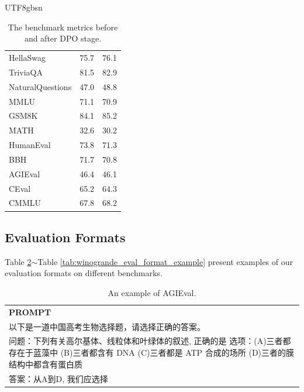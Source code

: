 \documentclass[11pt, a4paper, logo, copyright, nonumbering]{deepseek}
\begin{document}
\begin{CJK*}{UTF8}{gbsn}
\begin{table}[h]
\begin{tabular}{lcc}
HellaSwag & 75.7 & 76.1 \\

TriviaQA & 81.5 & 82.9 \\

NaturalQuestions & 47.0 & 48.8 \\

MMLU & 71.1 & 70.9 \\

GSM8K & 84.1 & 85.2 \\

MATH & 32.6 & 30.2 \\

HumanEval & 73.8 & 71.3 \\

BBH & 71.7 & 70.8 \\

AGIEval & 46.4 & 46.1 \\

CEval & 65.2 & 64.3 \\

CMMLU & 67.8 & 68.2 \\
\bottomrule
\end{tabular}
    \caption{\centering The benchmark metrics before and after DPO stage. }
    \label{tab: dpo}
\end{table}

\subsection{Evaluation Formats}
\label{appendix:eval_formats}
Table \ref{tab:agieval_eval_format_example}$\sim$Table \ref{tab:winogrande_eval_format_example} present examples of our evaluation formats on different benchmarks.

\begin{table}[h]
    \centering \small
\begin{tabular}{p{12cm}}
\toprule
\textbf{PROMPT}\\
以下是一道中国高考生物选择题，请选择正确的答案。\\
问题：下列有关高尔基体、线粒体和叶绿体的叙述, 正确的是 选项：(A)三者都存在于蓝藻中 (B)三者都含有 DNA (C)三者都是 ATP 合成的场所 (D)三者的膜结构中都含有蛋白质\\
答案：从A到D, 我们应选择\\
\bottomrule
\end{tabular}
    \caption{\centering An example of AGIEval.}
    \label{tab:agieval_eval_format_example}
\end{table}


\end{CJK*}
\end{document}

